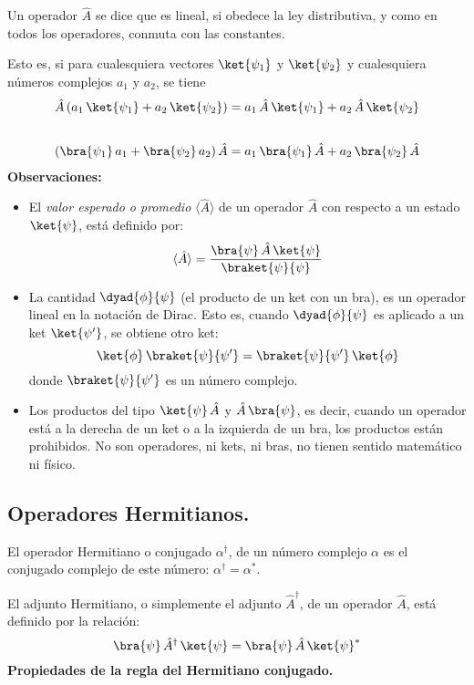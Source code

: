 Un operador $\hat{A}$ se dice que es lineal, si obedece la ley distributiva, y como en todos los operadores, conmuta con las constantes.
\par
Esto es, si para cualesquiera vectores $\ket{\psi_{1}}$ y $\ket{\psi_{2}}$ y cualesquiera números complejos $a_{1}$ y $a_{2}$, se tiene
\begin{align}
\hat{A} \, (a_{1} \, \ket{\psi_{1}} + a_{2} \, \ket{\psi_{2}}) &= a_{1} \, \hat{A} \, \ket{\psi_{1}} + a_{2} \, \hat{A} \, \ket{\psi_{2}} \label{eq:ecuacion_02_56} \\[1.75em]
( \bra{\psi_{1}} \, a_{1} +  \bra{\psi_{2}} \, a_{2}) \, \hat{A} &= a_{1} \, \bra{\psi_{1}} \, \hat{A} + a_{2} \, \bra{\psi_{2}} \, \hat{A} \label{eq:ecuacion_02_57}
\end{align}
\newpage
\textbf{Observaciones:}
\begin{itemize}
\item El \emph{valor esperado o promedio} $\langle{\hat{A}}\rangle$ de un operador $\hat{A}$ con respecto a un estado $\ket{\psi}$, está definido por:
\begin{equation}
\langle{\hat{A}}\rangle = \dfrac{\bra{\psi} \, \hat{A} \, \ket{\psi}}{\braket{\psi}{\psi}}
\label{eq:ecuacion_02_58}
\end{equation}
\item La cantidad $\dyad{\phi}{\psi}$ (el producto de un ket con un bra), es un operador lineal en la notación de Dirac. Esto es, cuando $\dyad{\phi}{\psi}$ es aplicado a un ket $\ket{\psi^{\prime}}$, se obtiene otro ket:
\begin{equation}
\ket{\phi} \, \braket{\psi}{\psi^{\prime}} =  \braket{\psi}{\psi^{\prime}} \, \ket{\phi}
\label{eq:ecuacion_02_59}
\end{equation}
donde $\braket{\psi}{\psi^{\prime}}$ es un número complejo.
\item Los productos del tipo $\ket{\psi} \, \hat{A}$ y $\hat{A} \, \bra{\psi}$, es decir, cuando un operador está a la derecha de un ket o a la izquierda de un bra, los productos están prohibidos. No son operadores, ni kets, ni bras, no tienen sentido matemático ni físico.
\end{itemize}
\subsection{Operadores Hermitianos.}
El operador Hermitiano o conjugado $\alpha^{\dagger}$, de un número complejo $\alpha$ es el conjugado complejo de este número: $\alpha^{\dagger} = \alpha^{*}$.
\par
El adjunto Hermitiano, o simplemente el adjunto $\hat{A}^{\dagger}$, de un operador $\hat{A}$, está definido por la relación:
\begin{equation}
\bra{\psi} \, \hat{A}^{\dagger} \, \ket{\psi} = \bra{\psi} \, \hat{A} \, \ket{\psi}^{*}
\label{eq:ecuacion_02_60}
\end{equation}
\textbf{Propiedades de la regla del Hermitiano conjugado.}

